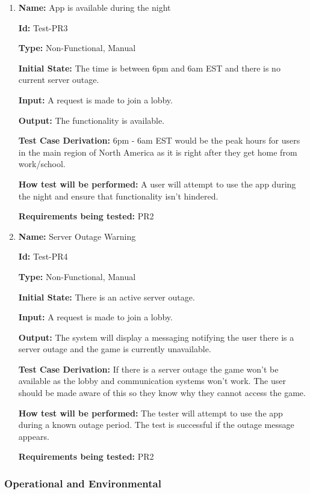 \documentclass[12pt, titlepage]{article}
\begin{document}
\begin{enumerate}
\item{\textbf{Name:} App is available during the night} \label{itm:Test-PR3}

\textbf{Id:} Test-PR3

\textbf{Type:} Non-Functional, Manual
					
\textbf{Initial State:} The time is between 6pm and 6am EST and there is no current server outage. 
					
\textbf{Input:} A request is made to join a lobby.  
					
\textbf{Output:} The functionality is available. 

\textbf{Test Case Derivation:} 6pm - 6am EST would be the peak hours for users in the main region of North America as it is right after they get home from work/school. 
					
\textbf{How test will be performed:} A user will attempt to use the app during the night and ensure that functionality isn't hindered. 

\textbf{Requirements being tested:} PR2

\item{\textbf{Name:} Server Outage Warning} \label{itm:Test-PR4}

\textbf{Id:} Test-PR4

\textbf{Type:} Non-Functional, Manual
					
\textbf{Initial State:} There is an active server outage. 
					
\textbf{Input:} A request is made to join a lobby.  
					
\textbf{Output:} The system will display a messaging notifying the user there is a server outage and the game is currently unavailable. 

\textbf{Test Case Derivation:} If there is a server outage the game won't be available as the lobby and communication systems won't work. The user should be made aware of this so they know why they cannot access the game.
					
\textbf{How test will be performed:} The tester will attempt to use the app during a known outage period. The test is successful if the outage message appears.

\textbf{Requirements being tested:} PR2

\end{enumerate}

\subsubsection{Operational and Environmental}
\end{document}
